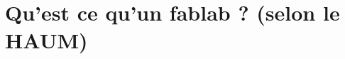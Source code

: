 \documentclass[a4paper,10pt]{scrartcl}
\begin{document}
% 
% 
% 
% 
% 
% 
% 

\section{Qu'est ce qu'un fablab ? (selon le HAUM)}
\end{document}
